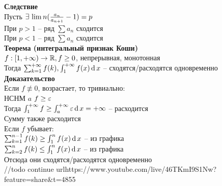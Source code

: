\documentclass[12pt]{article}
\begin{document}
\textbf{Следствие}\\
Пусть $\exists\, \lim n(\frac{a_n}{a_{n+1}}-1) = p$\\
При $p > 1$ -- ряд $\sum a_n$ сходится\\
При $p < 1$ -- ряд $\sum a_n$ сходится\\
\textbf{Теорема (интегральный признак Коши)}\\
$f: [1, +\infty) \rightarrow \mathbb{R}, f \geq 0$, непрерывная, монотонная\\
Тогда $\sum_{k=1}^{+\infty} f(k), \int_1^{+\infty} f(x)\operatorname{d} x$ -- сходятся/расходятся одновременно\\
\textbf{Доказательство}\\
Если $f\not\equiv0$, возрастает, то тривиально:\\
НСНМ $a$ $f \geq \varepsilon$\\
Тогда $\int_1^{+\infty} f \geq \int_a^{+\infty} \varepsilon \operatorname{d} x = +\infty$ -- расходится\\
Сумму также расходится\\
Если $f$ убывает:\\
$\sum_{k=1}^{n-1} f(k) \geq \int_1^n f(x)\operatorname{d} x$ -- из графика\\
$\sum_{k=2}^n f(k) \leq \int_1^n f(x)\operatorname{d} x$ -- из графика\\
Отсюда они сходятся/расходятся одновременно\\
//todo continue url{https://www.youtube.com/live/46TKmI9S1Nw?feature=share&t=4855}
\end{document}
